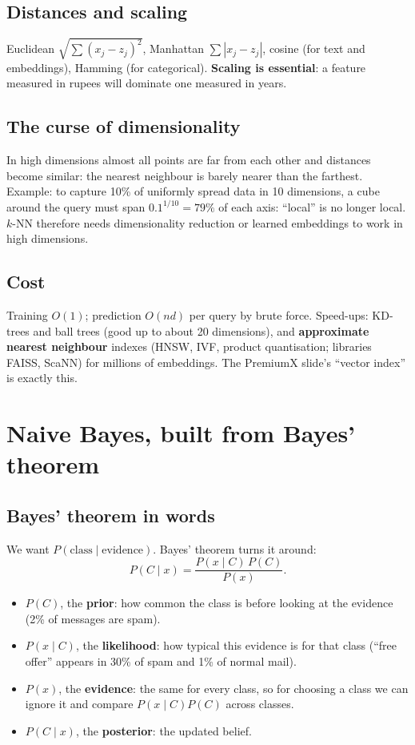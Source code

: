 \subsection{Distances and scaling}
Euclidean $\sqrt{\sum(x_j - z_j)^2}$, Manhattan $\sum|x_j - z_j|$, cosine (for text and embeddings), Hamming (for
categorical). \textbf{Scaling is essential}: a feature measured in rupees will dominate one measured in years.

\subsection{The curse of dimensionality}
In high dimensions almost all points are far from each other and distances become similar: the nearest neighbour is barely
nearer than the farthest. Example: to capture 10\% of uniformly spread data in 10 dimensions, a cube around the query must span
$0.1^{1/10} = 79\%$ of each axis: ``local'' is no longer local. $k$-NN therefore needs dimensionality reduction or learned
embeddings to work in high dimensions.

\subsection{Cost}
Training $O(1)$; prediction $O(nd)$ per query by brute force. Speed-ups: KD-trees and ball trees (good up to about 20
dimensions), and \textbf{approximate nearest neighbour} indexes (HNSW, IVF, product quantisation; libraries FAISS, ScaNN)
for millions of embeddings. The PremiumX slide's ``vector index'' is exactly this.

\section{Naive Bayes, built from Bayes' theorem}

\subsection{Bayes' theorem in words}
We want $P(\text{class}\mid\text{evidence})$. Bayes' theorem turns it around:
\[ P(C\mid x) = \frac{P(x\mid C)\,P(C)}{P(x)}. \]
\begin{itemize}
\item $P(C)$, the \textbf{prior}: how common the class is before looking at the evidence (2\% of messages are spam).
\item $P(x\mid C)$, the \textbf{likelihood}: how typical this evidence is for that class (``free offer'' appears in 30\% of
  spam and 1\% of normal mail).
\item $P(x)$, the \textbf{evidence}: the same for every class, so for choosing a class we can ignore it and compare
  $P(x\mid C)P(C)$ across classes.
\item $P(C\mid x)$, the \textbf{posterior}: the updated belief.
\end{itemize}

